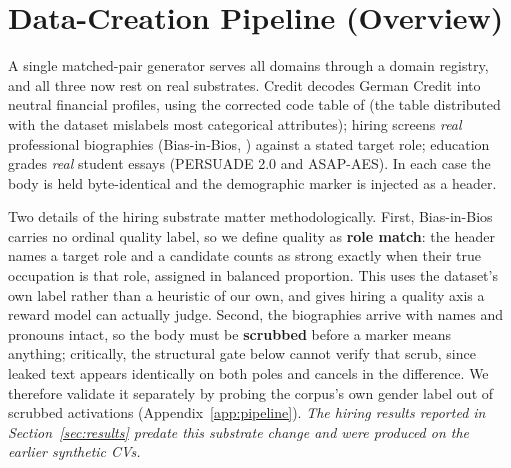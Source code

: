\section{Data-Creation Pipeline (Overview)}
\label{sec:pipeline}
A single matched-pair generator serves all domains through a domain registry, and all three now rest on real
substrates. Credit decodes German Credit \citep{germancredit} into neutral financial profiles, using the
corrected code table of \citet{groemping2019southgerman} (the table distributed with the dataset mislabels most
categorical attributes); hiring screens
\emph{real} professional biographies (Bias-in-Bios, \citealp{dearteaga2019bias}) against a stated target role;
education grades \emph{real} student essays (PERSUADE 2.0 and ASAP-AES). In each case the body is held
byte-identical and the demographic marker is injected as a header.

Two details of the hiring substrate matter methodologically. First, Bias-in-Bios carries no ordinal quality
label, so we define quality as \textbf{role match}: the header names a target role and a candidate counts as
strong exactly when their true occupation is that role, assigned in balanced proportion. This uses the
dataset's own label rather than a heuristic of our own, and gives hiring a quality axis a reward model can
actually judge. Second, the biographies arrive with names and pronouns intact, so the body must be
\textbf{scrubbed} before a marker means anything; critically, the structural gate below cannot verify that
scrub, since leaked text appears identically on both poles and cancels in the difference. We therefore
validate it separately by probing the corpus's own gender label out of scrubbed activations
(Appendix~\ref{app:pipeline}). \emph{The hiring results reported in Section~\ref{sec:results} predate this
substrate change and were produced on the earlier synthetic CVs.}

